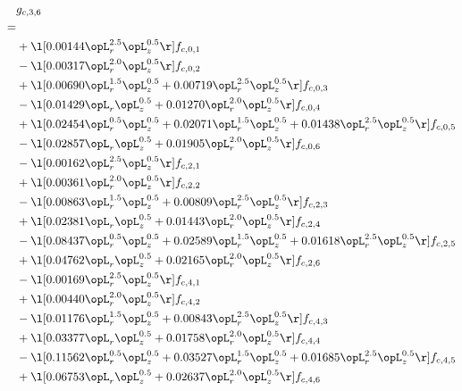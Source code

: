 \begin{alignat}{2} 
\label{eq:g_36_0} 
& g_{c,3,6} \nonumber \\ 
 = \\ 
& + \l[  0.00144 \opL_r^{2.5} \opL_z^{0.5}  \r] f_{c,0,1} \nonumber \\ 
& - \l[  0.00317 \opL_r^{2.0} \opL_z^{0.5}  \r] f_{c,0,2} \nonumber \\ 
& + \l[  0.00690 \opL_r^{1.5} \opL_z^{0.5} +  0.00719 \opL_r^{2.5} \opL_z^{0.5}  \r] f_{c,0,3} \nonumber \\ 
& - \l[  0.01429 \opL_r \opL_z^{0.5} +  0.01270 \opL_r^{2.0} \opL_z^{0.5}  \r] f_{c,0,4} \nonumber \\ 
& + \l[  0.02454 \opL_r^{0.5} \opL_z^{0.5} +  0.02071 \opL_r^{1.5} \opL_z^{0.5} +  0.01438 \opL_r^{2.5} \opL_z^{0.5}  \r] f_{c,0,5} \nonumber \\ 
& - \l[  0.02857 \opL_r \opL_z^{0.5} +  0.01905 \opL_r^{2.0} \opL_z^{0.5}  \r] f_{c,0,6} \nonumber \\ 
& - \l[  0.00162 \opL_r^{2.5} \opL_z^{0.5}  \r] f_{c,2,1} \nonumber \\ 
& + \l[  0.00361 \opL_r^{2.0} \opL_z^{0.5}  \r] f_{c,2,2} \nonumber \\ 
& - \l[  0.00863 \opL_r^{1.5} \opL_z^{0.5} +  0.00809 \opL_r^{2.5} \opL_z^{0.5}  \r] f_{c,2,3} \nonumber \\ 
& + \l[  0.02381 \opL_r \opL_z^{0.5} +  0.01443 \opL_r^{2.0} \opL_z^{0.5}  \r] f_{c,2,4} \nonumber \\ 
& - \l[  0.08437 \opL_r^{0.5} \opL_z^{0.5} +  0.02589 \opL_r^{1.5} \opL_z^{0.5} +  0.01618 \opL_r^{2.5} \opL_z^{0.5}  \r] f_{c,2,5} \nonumber \\ 
& + \l[  0.04762 \opL_r \opL_z^{0.5} +  0.02165 \opL_r^{2.0} \opL_z^{0.5}  \r] f_{c,2,6} \nonumber \\ 
& - \l[  0.00169 \opL_r^{2.5} \opL_z^{0.5}  \r] f_{c,4,1} \nonumber \\ 
& + \l[  0.00440 \opL_r^{2.0} \opL_z^{0.5}  \r] f_{c,4,2} \nonumber \\ 
& - \l[  0.01176 \opL_r^{1.5} \opL_z^{0.5} +  0.00843 \opL_r^{2.5} \opL_z^{0.5}  \r] f_{c,4,3} \nonumber \\ 
& + \l[  0.03377 \opL_r \opL_z^{0.5} +  0.01758 \opL_r^{2.0} \opL_z^{0.5}  \r] f_{c,4,4} \nonumber \\ 
& - \l[  0.11562 \opL_r^{0.5} \opL_z^{0.5} +  0.03527 \opL_r^{1.5} \opL_z^{0.5} +  0.01685 \opL_r^{2.5} \opL_z^{0.5}  \r] f_{c,4,5} \nonumber \\ 
& + \l[  0.06753 \opL_r \opL_z^{0.5} +  0.02637 \opL_r^{2.0} \opL_z^{0.5}  \r] f_{c,4,6} \nonumber \\ 

\end{alignat}
